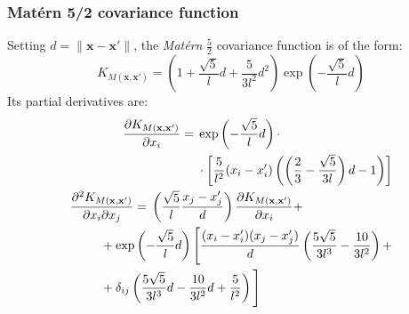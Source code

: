 \documentclass[10pt,a4paper,twocolumn]{article}
\begin{document}
\subsubsection{Matérn 5/2 covariance function}
Setting $d = \|\mathbf{x} - \mathbf{x'}\|$, the \textit{Matérn} $\frac{5}{2}$ covariance function is of the form: 
\begin{equation}\label{eq:matern}
	K_{M(\mathbf{x}, \mathbf{x'})} = \left( 1 + \frac{\sqrt{5}}{l} d + \frac{5}{3l^2} d^2 \right) \exp \left( -\frac{\sqrt{5}}{l} d \right)
\end{equation}
Its partial derivatives are:
\small
\begin{align}
	\begin{split}
		\frac{\partial K_{M(\mathbf{x}, \mathbf{x'})}}{\partial x_i} ={}& \exp \left( -\frac{\sqrt{5}}{l} d \right) \cdot \\
		& \cdot \left[ \frac{5}{l^2}(x_i - x_i')\left(\left(\frac{2}{3} - \frac{\sqrt{5}}{3l}\right) d - 1 \right) \right]
	\end{split}
	 \\
	 \begin{split}
	 	\frac{\partial^2  K_{M(\mathbf{x}, \mathbf{x'})}}{\partial x_i \partial x_j} ={}& \left( \frac{\sqrt{5}}{l} \frac{x_j - x_j'}{d} \right) \frac{\partial K_{M(\mathbf{x}, \mathbf{x'})}}{\partial x_i} + \\
	 	& \hspace{-40pt} + \exp \left( -\frac{\sqrt{5}}{l} d \right) \Bigg[ \Bigg. \frac{(x_i - x_i')(x_j - x_j')}{d} \left( \frac{5 \sqrt{5}}{3l^3} - \frac{10}{3l^2} \right) + \\
	 	& \hspace{-40pt} + \delta_{ij} \left( \frac{5 \sqrt{5}}{3l^3}d - \frac{10}{3l^2}d + \frac{5}{l^2} \right) \Bigg. \Bigg]
	 \end{split}	
\end{align}
\normalsize
\end{document}

